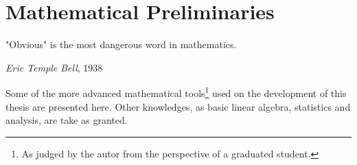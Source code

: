 \chapter{Mathematical Preliminaries}

\epigraph{"Obvious" is the most dangerous word in mathematics.}{\textit{Eric Temple
Bell}, 1938}

Some of the more advanced mathematical tools\footnote{As judged by the autor
from the perspective of a graduated student.} used on the development of this
thesis are presented here.
Other knowledges, as basic linear algebra, statistics and analysis, are take as
granted.



